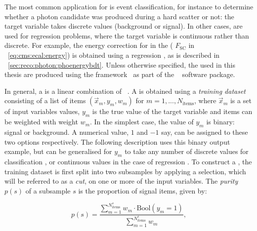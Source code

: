 The most common application for \BDT\s is event classification, for instance to determine whether a photon candidate was produced during a hard scatter or not: the target variable takes discrete values (background or signal). In other cases, \BDT\s are used for regression problems, where the target variable is continuous rather than discrete. For example, the energy correction for \SC\s in the \ECAL ( $F_{\text{SC}}$ in \Eq~\ref{eq:cms:ecal:energy}) is obtained using a regression \BDT, as is described in \Sec~\ref{sec:reco:photon:phoenergybdt}. Unless otherwise specified, the \BDT\s used in this thesis are produced using the \TMVA framework~\cite{TMVA} as part of the \ROOT~\cite{root} software package. 

In general, a \BDT is a linear combination of \DT\s~\cite{friedman2009}. A \DT is obtained using a \emph{training dataset} consisting of a list of items $(\vec{x}_{m},y_{m},w_{m})$ for $m=1,...,N_{\textrm{items}}$, where $\vec{x}_{m}$ is a set of input variables values, $y_{m}$ is the true value of the target variable and items can be weighted with weight $w_{m}$. In the simplest case, the value of $y_{m}$ is binary: signal or background. A numerical value, $1$ and $-1$ say, can be assigned to these two options respectively. The following description uses this binary output example, but can be generalised for $y_{m}$ to take any number of discrete values for classification \DT\s, or continuous values in the case of regression \DT\s.
To construct a \DT, the training dataset is first split into two subsamples by applying a selection, which will be referred to as a \emph{cut}, on one or more of the input variables. The \emph{purity} $p(s)$ of a subsample $s$ is the proportion of signal items, given by:

\begin{equation}
 p(s) = \frac{\sum_{m=1}^{N_{\textrm{items}}^{s}} w_{m} \cdot \textrm{Bool}(y_m=1)}{\sum_{m=1}^{N_{\textrm{items}}^{s}} w_{m}}, 
\end{equation}

